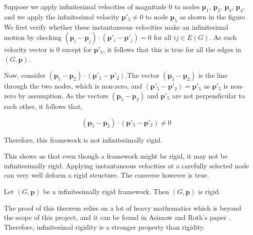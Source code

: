 \begin{flushleft}
Suppose we apply infinitesimal velocities of magnitude $0$ to nodes $\mathbf{p}_1$, $\mathbf{p}_2$, $\mathbf{p}_3$, $\mathbf{p}_4$, and we apply the infinitesimal velocity $\mathbf{p}'_5 \neq 0$ to node $\mathbf{p}_5$ as shown in the figure. We first verify whether these instantaneous velocities make an infinitesimal motion by checking $(\mathbf{p}_i - \mathbf{p}_j) \cdot (\mathbf{p}'_i - \mathbf{p}'_j) = 0$ for all $ij \in E(G)$. As each velocity vector is $0$ except for $\mathbf{p}'_5$, it follows that this is true for all the edges in $(G,\mathbf{p})$.
\end{flushleft}

\begin{flushleft}
Now, consider $(\mathbf{p}_5 - \mathbf{p}_2) \cdot (\mathbf{p}'_5 - \mathbf{p}'_2)$.The vector $(\mathbf{p}_5 - \mathbf{p}_2)$ is the line through the two nodes, which is non-zero, and $(\mathbf{p}'_5 - \mathbf{p}'_2) = \mathbf{p}'_5$ as $\mathbf{p}'_5$ is non-zero by assumption. As the vectors $(\mathbf{p}_5 - \mathbf{p}_2)$ and $\mathbf{p}'_5$ are not perpendicular to each other, it follows that,

\[
(\mathbf{p}_5 - \mathbf{p}_2) \cdot (\mathbf{p}'_5 - \mathbf{p}'_2) \neq 0
\]
\end{flushleft}

\begin{flushleft}
Therefore, this framework is not infinitesimally rigid. 
\end{flushleft}

\begin{flushleft}
This shows us that even though a framework might be rigid, it may not be infinitesimally rigid. Applying instantaneous velocities at a carefully selected node can very well deform a rigid structure. The converse however is true.
\end{flushleft}

\begin{theorem}
Let $(G,\mathbf{p})$ be a infinitesimally rigid framework. Then $(G,\mathbf{p})$ is rigid.
\end{theorem}

\begin{flushleft}
The proof of this theorem relies on a lot of heavy mathematics which is beyond the scope of this project, and it can be found in Asimow and Roth's paper \cite{asimow}. Therefore, infinitesimal rigidity is a stronger property than rigidity. 
\end{flushleft}

